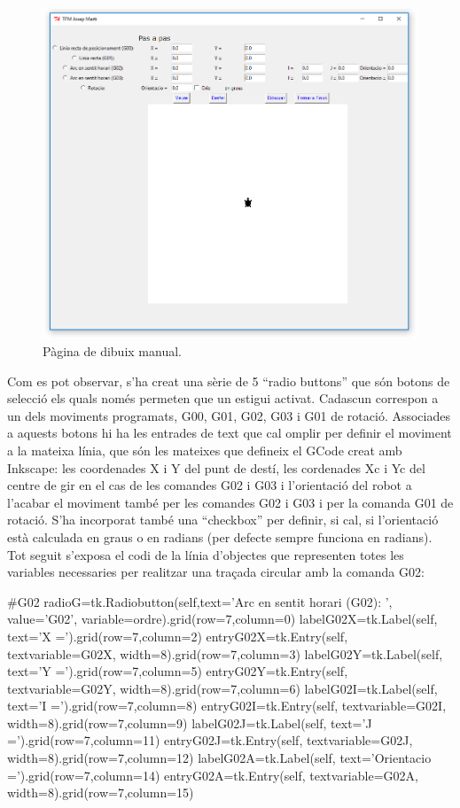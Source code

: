 \begin{figure}[H]
	\centering
	\includegraphics[scale=0.9]{ManualPage}
	\caption{Pàgina de dibuix manual.}
	\label{fig:ManualPage}
\end{figure}

Com es pot observar, s’ha creat una sèrie de 5  “radio buttons” que són botons de selecció els quals només permeten que un estigui activat. Cadascun correspon a un dels moviments programats, G00, G01, G02, G03 i G01 de rotació. Associades a aquests botons hi ha les entrades de text que cal omplir per definir el moviment a la mateixa línia, que són les mateixes que defineix el GCode creat amb Inkscape: les coordenades X i Y del punt de destí, les cordenades Xc i Yc del centre de gir en el cas de les comandes G02 i G03 i l’orientació del robot a l'acabar el moviment també per les comandes G02 i G03 i per la comanda G01 de rotació. S’ha incorporat també una “checkbox” per definir, si cal, si l’orientació està calculada en graus o en radians (per defecte sempre funciona en radians). Tot seguit s'exposa el codi de la línia d'objectes que representen totes les variables necessaries per realitzar una traçada circular amb la comanda G02:

\begin{python}
	#G02
	radioG=tk.Radiobutton(self,text='Arc en sentit horari (G02): ', value='G02', variable=ordre).grid(row=7,column=0)
	labelG02X=tk.Label(self, text='X =').grid(row=7,column=2)
	entryG02X=tk.Entry(self, textvariable=G02X, width=8).grid(row=7,column=3)
	labelG02Y=tk.Label(self, text='Y =').grid(row=7,column=5)
	entryG02Y=tk.Entry(self, textvariable=G02Y, width=8).grid(row=7,column=6)
	labelG02I=tk.Label(self, text='I =').grid(row=7,column=8)
	entryG02I=tk.Entry(self, textvariable=G02I, width=8).grid(row=7,column=9)
	labelG02J=tk.Label(self, text='J =').grid(row=7,column=11)
	entryG02J=tk.Entry(self, textvariable=G02J, width=8).grid(row=7,column=12)
	labelG02A=tk.Label(self, text='Orientacio =').grid(row=7,column=14)
	entryG02A=tk.Entry(self, textvariable=G02A, width=8).grid(row=7,column=15)
\end{python}

